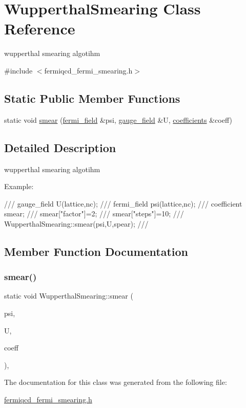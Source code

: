 \hypertarget{class_wupperthal_smearing}{}\section{Wupperthal\+Smearing Class Reference}
\label{class_wupperthal_smearing}


wupperthal smearing algotihm  




{\ttfamily \#include $<$fermiqcd\+\_\+fermi\+\_\+smearing.\+h$>$}

\subsection*{Static Public Member Functions}
\begin{DoxyCompactItemize}
\item 
static void \hyperlink{class_wupperthal_smearing_a484201d5d7f970d0c8a6a97daf100d78}{smear} (\hyperlink{classfermi__field}{fermi\+\_\+field} \&psi, \hyperlink{classgauge__field}{gauge\+\_\+field} \&U, \hyperlink{classcoefficients}{coefficients} \&coeff)
\end{DoxyCompactItemize}


\subsection{Detailed Description}
wupperthal smearing algotihm 

Example\+: \begin{DoxyVerb}/// gauge_field U(lattice,nc);
/// fermi_field psi(lattice,nc);
/// coefficient smear;
/// smear["factor"]=2;
/// smear["steps"]=10;
/// WupperthalSmearing::smear(psi,U,spear);
/// \end{DoxyVerb}
 

\subsection{Member Function Documentation}
\mbox{\label{class_wupperthal_smearing_a484201d5d7f970d0c8a6a97daf100d78}} 
\subsubsection{\texorpdfstring{smear()}{smear()}}
{\footnotesize\ttfamily static void Wupperthal\+Smearing\+::smear (\begin{DoxyParamCaption}\item[{\hyperlink{classfermi__field}{fermi\+\_\+field} \&}]{psi,  }\item[{\hyperlink{classgauge__field}{gauge\+\_\+field} \&}]{U,  }\item[{\hyperlink{classcoefficients}{coefficients} \&}]{coeff }\end{DoxyParamCaption})\hspace{0.3cm}{\ttfamily [inline]}, {\ttfamily [static]}}



The documentation for this class was generated from the following file\+:\begin{DoxyCompactItemize}
\item 
\hyperlink{fermiqcd__fermi__smearing_8h}{fermiqcd\+\_\+fermi\+\_\+smearing.\+h}\end{DoxyCompactItemize}
